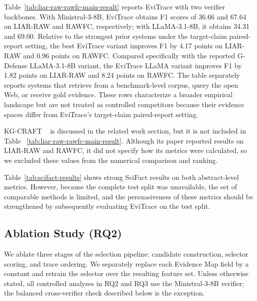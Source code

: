 \documentclass[letterpaper]{article}
\begin{document}
Table~\ref{tab:liar-raw-rawfc-main-result} reports EviTrace with
two verifier backbones. With Ministral-3-8B, EviTrace obtains F1
scores of 36.66 and 67.64 on LIAR-RAW and RAWFC, respectively;
with LLaMA-3.1-8B, it obtains 34.31 and 69.00. 
Relative to the strongest prior systems under the target-claim
paired-report setting, the best EviTrace variant improves F1 by
4.17 points on LIAR-RAW and 0.96 points on RAWFC.
Compared specifically with the reported G-Defense
LLaMA-3.1-8B variant, the EviTrace LLaMA variant improves F1 by
1.82 points on LIAR-RAW and 8.24 points on RAWFC.
The table separately reports
systems that retrieve from a benchmark-level corpus, query the open Web,
or receive gold evidence. These rows characterize a broader empirical
landscape but are not treated as controlled competitors because their
evidence spaces differ from EviTrace's target-claim paired-report setting.

KG-CRAFT ~\citep{Lourenco2026KGCRAFT} is discussed in the related work section, but it is not included in Table ~\ref{tab:liar-raw-rawfc-main-result}. Although its paper reported results on LIAR-RAW and RAWFC, it did not specify how its metrics were calculated, so we excluded these values from the numerical comparison and ranking.

Table~\ref{tab:scifact-results} shows strong SciFact results on both abstract-level metrics. However, because the complete test split was unavailable, the set of comparable methods is limited, and the persuasiveness of these metrics should be strengthened by subsequently evaluating EviTrace on the test split.

\subsection{Ablation Study (RQ2)}

We ablate three stages of the selection pipeline: candidate
construction, selector scoring, and trace ordering. We separately
replace each Evidence Map field by a constant and retrain the
selector over the resulting feature set.
Unless otherwise stated, all controlled analyses in RQ2 and RQ3
use the Ministral-3-8B verifier; the balanced cross-verifier check
described below is the exception.
\end{document}
